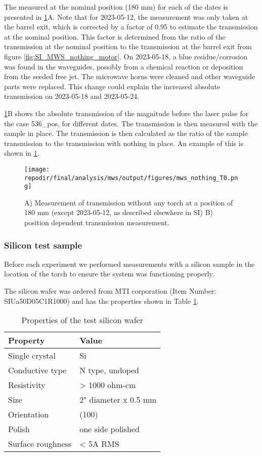 The  measured at the nominal position (180 mm) for each of the dates is presented in \ref{fig:SI_MWS_nothing_T0}A. Note that for 2023-05-12, the measurement was only taken at the barrel exit, which is corrected by a factor of 0.95 to estimate the transmission at the nominal position. This factor is determined from the ratio of the transmission at the nominal position to the transmission at the barrel exit from figure \ref{fig:SI_MWS_nothing_motor}. On 2023-05-18, a blue residue/corrosion was found in the waveguides, possibly from a chemical reaction or deposition from the seeded free jet. The microwave horns were cleaned and other waveguide parts were replaced. This change could explain the increased absolute transmission on 2023-05-18 and 2023-05-24.  

\ref{fig:SI_MWS_nothing_T0}B shows the absolute transmission of the magnitude before the laser pulse for the case 536\_pos, for different dates. The transmission is then measured with the sample in place. The transmission is then calculated as the ratio of the sample transmission to the transmission with nothing in place. An example of this is shown in \ref{fig:SI_MWS_nothing_T0}.  


\begin{figure}[]
\centering
\texttt{[image: \\repodir/final/analysis/mws/output/figures/mws\_nothing\_T0.png]}
\caption{A) Measurement of transmission without any torch at a position of 180 mm (except 2023-05-12, as described elsewhere in SI) B) position dependent transmission measurement.}
\label{fig:SI_MWS_nothing_T0}
\end{figure}

\subsubsection{Silicon test sample}

Before each experiment we performed measurements with a silicon sample in the location of the torch to ensure the system was functioning properly. 

The silicon wafer was ordered from MTI corporation (Item Number: SIUa50D05C1R1000) and has the properties shown in Table \ref{table:material_properties}.

\begin{table}[h]
\centering
\begin{tabular}{|l|l|}
\hline
Property & Value \\
\hline
Single crystal & Si \\
Conductive type & N type, undoped \\
Resistivity & > 1000 ohm-cm \\
Size & 2" diameter x 0.5 mm \\
Orientation & (100) \\
Polish & one side polished \\
Surface roughness & < 5A RMS \\
\hline
\end{tabular}
\caption{Properties of the test silicon wafer}
\label{table:material_properties}
\end{table}

